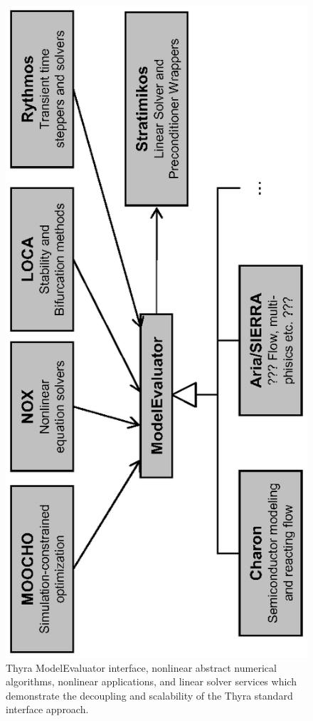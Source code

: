 \documentclass[pdf,ps2pdf,11pt]{SANDreport}
\begin{document}
{\bsinglespace
\begin{figure}
\begin{center}
\includegraphics*[angle=270,scale=0.90
]{ModelEvaluator}
\end{center}
\caption{
\label{fig:ModelEvaluator}
Thyra ModelEvaluator interface, nonlinear abstract numerical algorithms,
nonlinear applications, and linear solver services which demonstrate the
decoupling and scalability of the Thyra standard interface approach. }
\end{figure}
\esinglespace}
\end{document}
